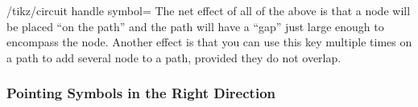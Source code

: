 \begin{key}{/tikz/circuit handle symbol=}
    The net effect of all of the above is that a node will be placed ``on the
    path'' and the path will have a ``gap'' just large enough to encompass the
    node. Another effect is that you can use this key multiple times on a path
    to add several node to a path, provided they do not overlap.
\begin{codeexample}[]
\end{codeexample}
\begin{codeexample}[]
\end{codeexample}
\end{key}


\subsubsection{Pointing Symbols in the Right Direction}


